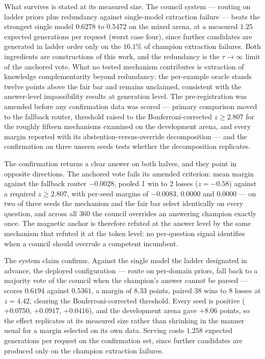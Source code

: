 What survives is stated at its measured size. The council system --- routing on
ladder priors plus redundancy against single-model extraction failure --- beats
the strongest single model $0.6278$ to $0.5472$ on the mixed arena, at a measured $1.25$
expected generations per request (worst case four), since further candidates are
generated in ladder order only on the $16.1\%$ of champion extraction failures. Both ingredients are constructions of this
work, and the redundancy is the $\tau \to \infty$ limit of the anchored vote.
What no tested mechanism contributes is extraction of knowledge complementarity
beyond redundancy: the per-example oracle stands twelve points above the fair
bar and remains unclaimed, consistent with the answer-level impossibility
results at generation level. The pre-registration was amended before any
confirmation data was scored --- primary comparison moved to the fallback
router, threshold raised to the Bonferroni-corrected $z \geq 2.807$ for the
roughly fifteen mechanisms examined on the development arena, and every margin
reported with its abstention-versus-override decomposition --- and the
confirmation on three unseen seeds tests whether the decomposition replicates.

The confirmation returns a clear answer on both halves, and they point in
opposite directions. The anchored vote fails its amended criterion: mean margin
against the fallback router $-0.0028$, pooled 1 win to 2 losses ($z = -0.58$)
against a required $z \geq 2.807$, with per-seed margins of $-0.0083$, $0.0000$
and $0.0000$ --- on two of three seeds the mechanism and the fair bar select
identically on every question, and across all 360 the council overrides an
answering champion exactly once. The magnetic anchor is therefore refuted at the
answer level by the same mechanism that refuted it at the token level: no
per-question signal identifies when a council should overrule a competent
incumbent.

The system claim confirms. Against the single model the ladder designated in
advance, the deployed configuration --- route on per-domain priors, fall back to
a majority vote of the council when the champion's answer cannot be parsed ---
scores $0.6194$ against $0.5361$, a margin of $8.33$ points, paired 38 wins to 8
losses at $z = 4.42$, clearing the Bonferroni-corrected threshold. Every seed is
positive ($+0.0750$, $+0.0917$, $+0.0416$), and the development arena gave
$+8.06$ points, so the effect replicates at its measured size rather than
shrinking in the manner usual for a margin selected on its own data. Serving
costs $1.258$ expected generations per request on the confirmation set, since
further candidates are produced only on the champion extraction failures.

